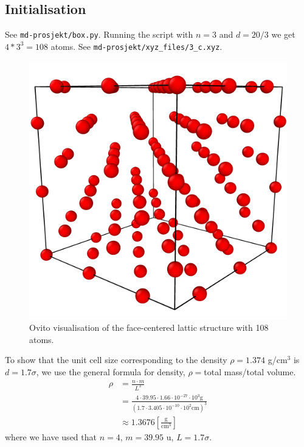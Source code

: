 \documentclass[a4paper,10pt,english]{article}
\begin{document}
\newpage

\subsection{Initialisation} \label{3c}

See \verb|md-prosjekt/box.py|. Running the script with $n=3$ and $d=20/3$ we get $4*3^3=108$ atoms. See \verb|md-prosjekt/xyz_files/3_c.xyz|. 

\begin{figure}[h!]
    \centering
    \includegraphics[scale=0.45]{../figures/3_c.png}
    \caption{Ovito visualisation of the face-centered lattic structure with 108 atoms.}
    \label{fig:ovito3}
\end{figure}

To show that the unit cell size corresponding to the density $\rho=1.374$ g/cm$^3$ is $d=1.7 \sigma$, we use the general formula for density, $\rho = $total mass/total volume.
\begin{align*}
    \rho
    &= \frac{n \cdot m}{L^3} \\
    &= \frac{4 \cdot 39.95 \cdot 1.66 \cdot 10^{-27} \cdot 10^{3} \text{g}}{{(1.7 \cdot 3.405 \cdot 10^{-10} \cdot 10^2 \text{cm})}^3} \\
    &\approx 1.3676 \left[ \frac{\text{g}}{\text{cm}^3} \right]
\end{align*}
where we have used that $n = 4$, $m = 39.95$ u, $L=1.7\sigma$.
\end{document}
